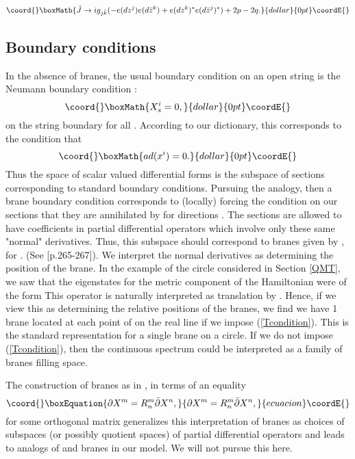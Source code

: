 \documentclass[a4paper,11pt]{amsart}
\providecommand{\db}{\bar{\partial}}
\begin{document}
$$\coord{}\boxMath{\bar J\rightarrow ig_{j\bar k}(-e(dz^j)e(d\bar z^k) + e(dz^k)^*e(d\bar
z^j)^*) + 2p-2q.}{dollar}{0pt}\coordE{}$$


\subsection{Boundary conditions}\label{BC}
In the absence of \coordHE{} branes, the usual boundary condition on an open string is 
the Neumann boundary condition :
$$\coord{}\boxMath{X_s^i = 0,}{dollar}{0pt}\coordE{}$$
on the string boundary for all \coordHE{}. According to our dictionary, this
corresponds to the condition that 
$$\coord{}\boxMath{ad(x^i) = 0.}{dollar}{0pt}\coordE{}$$
Thus the space of scalar valued differential forms is the subspace 
of sections corresponding to standard boundary conditions. Pursuing the analogy,
then a \coordHE{} brane boundary condition corresponds to (locally) forcing the
condition on our sections that they are annihilated by 
\coordHE{} for \coordHE{} directions \coordHE{}. The
 sections are
allowed to have coefficients in partial differential operators which involve 
only these same \coordHE{} "normal" derivatives. Thus, this 
subspace should correspond to \coordHE{} branes given by \coordHE{}, for 
\coordHE{}. (See \cite{P}[p.265-267]). 
We interpret the normal derivatives as determining the position of the
\coordHE{} brane. In the example of the circle considered in Section \ref{QMT}, we saw that the
eigenstates for the metric component of the Hamiltonian were of the form 
\coordHE{} This operator is naturally interpreted
as translation by \coordHE{}. Hence, if we view this as determining the relative
positions of the \coordHE{} branes, we find we have 1 brane located at each point of
\coordHE{} on the real line if we impose (\ref{Tcondition}). This is the standard
representation for a single brane on a circle. If we do not impose
(\ref{Tcondition}), then the continuous spectrum could be interpreted as a 
family of branes filling space. 

The construction of \coordHE{} branes as in \cite{OOY}, in terms of an equality 
\begin{equation}\coord{}\boxEquation{\label{Oz}
\partial X^m = R^m_n\db X^n,
}{\partial X^m = R^m_n\db X^n,
}{ecuacion}\coordE{}\end{equation} 
for some orthogonal matrix \coordHE{} generalizes this interpretation of \coordHE{}
 branes as choices of subspaces (or possibly quotient spaces) of partial
  differential operators and leads to analogs of \coordHE{} and \coordHE{} branes in 
  our model. We will not pursue this here. 
\end{document}
